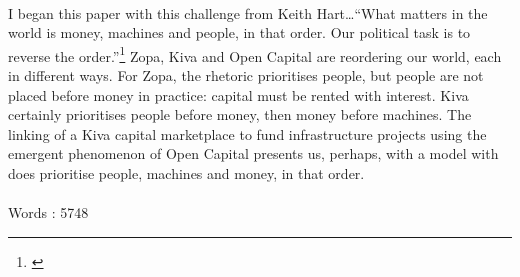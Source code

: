 \documentclass[12pt,a4paper,titlepage]{article}
\begin{document}
\paragraph{}I began this paper with this challenge from Keith Hart\ldots ``What matters in the world is money, machines and people, in that order. Our political task is to reverse the order.''\footnote{\cite[p. 6]{HartK2005thmd}} Zopa, Kiva and Open Capital are reordering our world, each in different ways. For Zopa, the rhetoric prioritises people, but people are not placed before money in practice: capital must be rented with interest. Kiva certainly prioritises people before money, then money before machines. The linking of a Kiva capital marketplace to fund infrastructure projects using the emergent phenomenon of Open Capital presents us, perhaps, with a model with does prioritise people, machines and money, in that order.
\medskip
\paragraph{}Words : 5748
\newpage
\singlespacing

\end{document}

